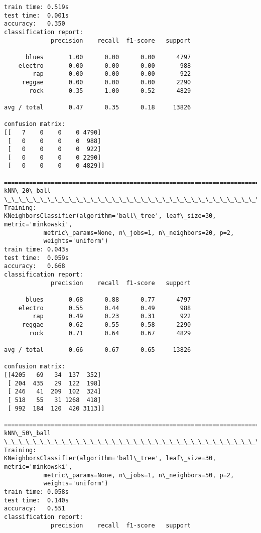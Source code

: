 \documentclass[11pt]{article}
\begin{document}
    \begin{Verbatim}[commandchars=\\\{\}]
train time: 0.519s
test time:  0.001s
accuracy:   0.350
classification report:
             precision    recall  f1-score   support

      blues       1.00      0.00      0.00      4797
    electro       0.00      0.00      0.00       988
        rap       0.00      0.00      0.00       922
     reggae       0.00      0.00      0.00      2290
       rock       0.35      1.00      0.52      4829

avg / total       0.47      0.35      0.18     13826

confusion matrix:
[[   7    0    0    0 4790]
 [   0    0    0    0  988]
 [   0    0    0    0  922]
 [   0    0    0    0 2290]
 [   0    0    0    0 4829]]

================================================================================
kNN\_20\_ball
\_\_\_\_\_\_\_\_\_\_\_\_\_\_\_\_\_\_\_\_\_\_\_\_\_\_\_\_\_\_\_\_\_\_\_\_\_\_\_\_\_\_\_\_\_\_\_\_\_\_\_\_\_\_\_\_\_\_\_\_\_\_\_\_\_\_\_\_\_\_\_\_\_\_\_\_\_\_\_\_
Training: 
KNeighborsClassifier(algorithm='ball\_tree', leaf\_size=30, metric='minkowski',
           metric\_params=None, n\_jobs=1, n\_neighbors=20, p=2,
           weights='uniform')
train time: 0.043s
test time:  0.059s
accuracy:   0.668
classification report:
             precision    recall  f1-score   support

      blues       0.68      0.88      0.77      4797
    electro       0.55      0.44      0.49       988
        rap       0.49      0.23      0.31       922
     reggae       0.62      0.55      0.58      2290
       rock       0.71      0.64      0.67      4829

avg / total       0.66      0.67      0.65     13826

confusion matrix:
[[4205   69   34  137  352]
 [ 204  435   29  122  198]
 [ 246   41  209  102  324]
 [ 518   55   31 1268  418]
 [ 992  184  120  420 3113]]

================================================================================
kNN\_50\_ball
\_\_\_\_\_\_\_\_\_\_\_\_\_\_\_\_\_\_\_\_\_\_\_\_\_\_\_\_\_\_\_\_\_\_\_\_\_\_\_\_\_\_\_\_\_\_\_\_\_\_\_\_\_\_\_\_\_\_\_\_\_\_\_\_\_\_\_\_\_\_\_\_\_\_\_\_\_\_\_\_
Training: 
KNeighborsClassifier(algorithm='ball\_tree', leaf\_size=30, metric='minkowski',
           metric\_params=None, n\_jobs=1, n\_neighbors=50, p=2,
           weights='uniform')
train time: 0.058s
test time:  0.140s
accuracy:   0.551
classification report:
             precision    recall  f1-score   support


\end{Verbatim}
\end{document}
